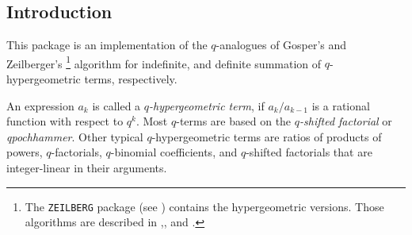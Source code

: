 

\newcommand{\qphihyp}[5]{{}_{#1}\phi_{#2}\left.\left[\begin{array}{c}
	#3 \\ #4 \end{array}\right|q,#5\right]}
\newcommand{\qpsihyp}[5]{{}_{#1}\psi_{#2}\left.\left[\begin{array}{c}
	#3 \\ #4 \end{array}\right|q,#5\right]}
\newcommand{\hyp}[5]{{}_{#1}F_{#2}\left.\left[\begin{array}{c}
	#3 \\ #4 \end{array}\right|#5\right]}

\newcommand{\fcn}[2]{{\mathrm #1}(#2)}
\newcommand{\ifcn}[3]{{\mathrm #1}_{#2}(#3)}
\newcommand{\qfac}[2]{\left(#1;\,q\right)_{#2}}
\newcommand{\qbinomial}[2]{{\binom{#1}{#2}\!}_q}

{\setcounter{redprompt}{0}}
\newcommand{\redprompt}{\stepcounter{redprompt}\theredprompt:}
\newenvironment{redoutput}{\small\begin{alltt}}{\end{alltt}\vskip-\parskip\noindent{}}


\subsection{Introduction}

This package is an implementation of the $q$-analogues of Gosper's
and Zeil\-berger's%
%
\footnote{The \texttt{ZEILBERG} package (see \cite{Koepf:95})
contains the hypergeometric versions. Those algorithms are described in 
\cite{Gosper:78},\cite{Zeilberger:91},\cite{Zeilberger:90}
and \cite{Koepf:95e}.}
%
algorithm for indefinite, and definite summation of
$q$-hypergeo\-metric terms, respectively.

An expression $a_k$ is called a \textsl{$q$-hypergeometric term}, if
$a_{k}/a_{k-1}$ is a rational function with respect to $q^k$. Most
$q$-terms are based on the \textsl{$q$-shifted factorial} or 
\textsl{qpochhammer}. Other typical $q$-hypergeometric terms are ratios 
of products of powers, $q$-factorials, $q$-binomial coefficients, and 
$q$-shifted factorials that are integer-linear in their arguments.


